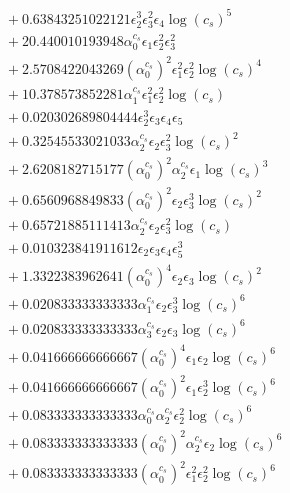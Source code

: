 \documentclass[10pt]{article}
\begin{document}
\begin{align*}
&{}  + 0.63843251022121 \epsilon_{2}^{3} \epsilon_{3}^{2} \epsilon_{4} \log{\left(c_{s} \right)}^{5} \\
&{}  + 20.440010193948 \alpha_{0}^{c_s} \epsilon_{1} \epsilon_{2}^{2} \epsilon_{3}^{2} \\
&{}  + 2.5708422043269 \left(\alpha_{0}^{c_s}\right)^{2} \epsilon_{1}^{2} \epsilon_{2}^{2} \log{\left(c_{s} \right)}^{4} \\
&{}  + 10.378573852281 \alpha_{1}^{c_s} \epsilon_{1}^{2} \epsilon_{2}^{2} \log{\left(c_{s} \right)} \\
&{}  + 0.020302689804444 \epsilon_{2}^{3} \epsilon_{3} \epsilon_{4} \epsilon_{5} \\
&{}  + 0.32545533021033 \alpha_{2}^{c_s} \epsilon_{2} \epsilon_{3}^{2} \log{\left(c_{s} \right)}^{2} \\
&{}  + 2.6208182715177 \left(\alpha_{0}^{c_s}\right)^{2} \alpha_{2}^{c_s} \epsilon_{1} \log{\left(c_{s} \right)}^{3} \\
&{}  + 0.6560968849833 \left(\alpha_{0}^{c_s}\right)^{2} \epsilon_{2} \epsilon_{3}^{3} \log{\left(c_{s} \right)}^{2} \\
&{}  + 0.65721885111413 \alpha_{2}^{c_s} \epsilon_{2} \epsilon_{3}^{2} \log{\left(c_{s} \right)} \\
&{}  + 0.010323841911612 \epsilon_{2} \epsilon_{3} \epsilon_{4} \epsilon_{5}^{3} \\
&{}  + 1.3322383962641 \left(\alpha_{0}^{c_s}\right)^{4} \epsilon_{2} \epsilon_{3} \log{\left(c_{s} \right)}^{2} \\
&{}  + 0.020833333333333 \alpha_{1}^{c_s} \epsilon_{2} \epsilon_{3}^{3} \log{\left(c_{s} \right)}^{6} \\
&{}  + 0.020833333333333 \alpha_{3}^{c_s} \epsilon_{2} \epsilon_{3} \log{\left(c_{s} \right)}^{6} \\
&{}  + 0.041666666666667 \left(\alpha_{0}^{c_s}\right)^{4} \epsilon_{1} \epsilon_{2} \log{\left(c_{s} \right)}^{6} \\
&{}  + 0.041666666666667 \left(\alpha_{0}^{c_s}\right)^{2} \epsilon_{1} \epsilon_{2}^{3} \log{\left(c_{s} \right)}^{6} \\
&{}  + 0.083333333333333 \alpha_{0}^{c_s} \alpha_{2}^{c_s} \epsilon_{2}^{2} \log{\left(c_{s} \right)}^{6} \\
&{}  + 0.083333333333333 \left(\alpha_{0}^{c_s}\right)^{2} \alpha_{2}^{c_s} \epsilon_{2} \log{\left(c_{s} \right)}^{6} \\
&{}  + 0.083333333333333 \left(\alpha_{0}^{c_s}\right)^{2} \epsilon_{1}^{2} \epsilon_{2}^{2} \log{\left(c_{s} \right)}^{6} \\

\end{align*}
\end{document}
